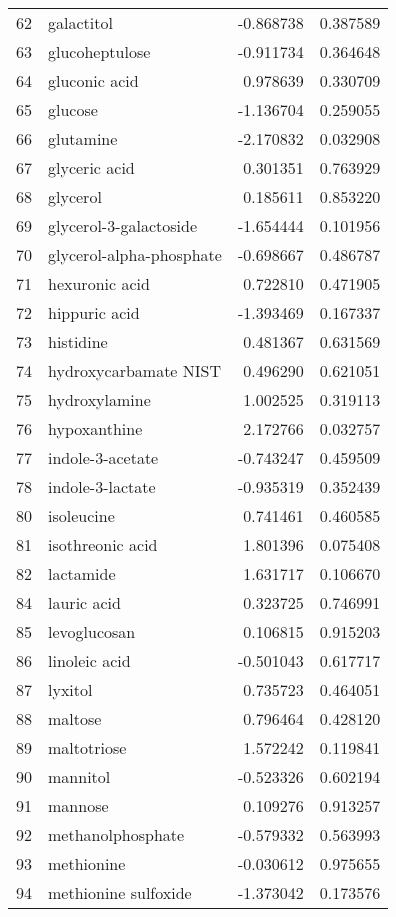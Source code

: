\begin{tabular}{llrr}
62 & galactitol & -0.868738 & 0.387589 \\
63 & glucoheptulose & -0.911734 & 0.364648 \\
64 & gluconic acid & 0.978639 & 0.330709 \\
65 & glucose & -1.136704 & 0.259055 \\
66 & glutamine & -2.170832 & 0.032908 \\
67 & glyceric acid & 0.301351 & 0.763929 \\
68 & glycerol & 0.185611 & 0.853220 \\
69 & glycerol-3-galactoside & -1.654444 & 0.101956 \\
70 & glycerol-alpha-phosphate & -0.698667 & 0.486787 \\
71 & hexuronic acid & 0.722810 & 0.471905 \\
72 & hippuric acid & -1.393469 & 0.167337 \\
73 & histidine & 0.481367 & 0.631569 \\
74 & hydroxycarbamate NIST & 0.496290 & 0.621051 \\
75 & hydroxylamine & 1.002525 & 0.319113 \\
76 & hypoxanthine & 2.172766 & 0.032757 \\
77 & indole-3-acetate & -0.743247 & 0.459509 \\
78 & indole-3-lactate & -0.935319 & 0.352439 \\
80 & isoleucine & 0.741461 & 0.460585 \\
81 & isothreonic acid & 1.801396 & 0.075408 \\
82 & lactamide & 1.631717 & 0.106670 \\
84 & lauric acid & 0.323725 & 0.746991 \\
85 & levoglucosan & 0.106815 & 0.915203 \\
86 & linoleic acid & -0.501043 & 0.617717 \\
87 & lyxitol & 0.735723 & 0.464051 \\
88 & maltose & 0.796464 & 0.428120 \\
89 & maltotriose & 1.572242 & 0.119841 \\
90 & mannitol & -0.523326 & 0.602194 \\
91 & mannose & 0.109276 & 0.913257 \\
92 & methanolphosphate & -0.579332 & 0.563993 \\
93 & methionine & -0.030612 & 0.975655 \\
94 & methionine sulfoxide & -1.373042 & 0.173576 \\

\end{tabular}
